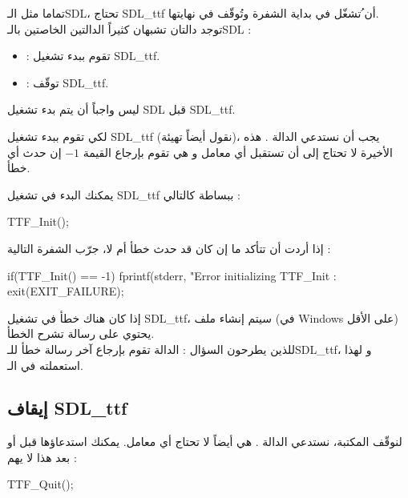 تماما مثل الـ\textenglish{SDL}،
تحتاج
\textenglish{SDL\_ttf}
أن ُتشغّل في بداية الشفرة وتُوقّف في نهايتها.\\
توجد دالتان تشبهان كثيراً الدالتين الخاصتين بالـ\textenglish{SDL} :

\begin{itemize}
	\item {} :
	تقوم ببدء تشغيل
	\textenglish{SDL\_ttf}.
	\item {} :
	توقّف
	\textenglish{SDL\_ttf}.
\end{itemize}

\begin{information}
ليس واجباً أن يتم بدء تشغيل
\textenglish{SDL}
قبل
\textenglish{SDL\_ttf}.
\end{information}

 لكي تقوم ببدء تشغيل
\textenglish{SDL\_ttf}
(نقول أيضاً تهيئة)، يجب أن نستدعي الدالة
.
هذه الأخيرة لا تحتاج إلى أن تستقبل أي معامل و هي تقوم بإرجاع القيمة
$-1$
إن حدث أي خطأ.

يمكنك البدء في تشغيل
\textenglish{SDL\_ttf}
ببساطة كالتالي :

\begin{Csource}
TTF_Init();
\end{Csource}

إذا أردت أن تتأكد ما إن كان قد حدث خطأ أم لا، جرّب الشفرة التالية :

\begin{Csource}
if(TTF_Init() == -1)
{
	fprintf(stderr, "Error initializing TTF_Init : %
	exit(EXIT_FAILURE);
}
\end{Csource}
إذا كان هناك خطأ في تشغيل
\textenglish{SDL\_ttf}،
سيتم إنشاء ملف
(في
\textenglish{Windows}
على الأقل) يحتوي على رسالة تشرح الخطأ.\\
للذين يطرحون السؤال : الدالة
تقوم بإرجاع آخر رسالة خطأ للـ\textenglish{SDL\_ttf}،
و لهذا استعملته في الـ.

\subsection{إيقاف \textenglish{SDL\_ttf}}

 لنوقّف المكتبة، نستدعي الدالة
.
هي أيضاً لا تحتاج أي معامل. يمكنك استدعاؤها قبل أو بعد
هذا لا يهم  :

\begin{Csource}
TTF_Quit();
\end{Csource}

